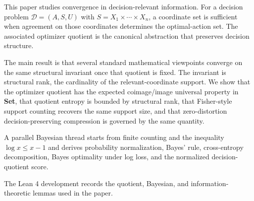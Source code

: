 This paper studies convergence in decision-relevant information. For a decision problem $\mathcal{D}=(A,S,U)$ with $S=X_1 \times \cdots \times X_n$, a coordinate set is sufficient when agreement on those coordinates determines the optimal-action set. The associated optimizer quotient is the canonical abstraction that preserves decision structure.

The main result is that several standard mathematical viewpoints converge on the same structural invariant once that quotient is fixed. The invariant is structural rank, the cardinality of the relevant-coordinate support. We show that the optimizer quotient has the expected coimage/image universal property in \textbf{Set}, that quotient entropy is bounded by structural rank, that Fisher-style support counting recovers the same support size, and that zero-distortion decision-preserving compression is governed by the same quantity.

A parallel Bayesian thread starts from finite counting and the inequality $\log x \le x - 1$ and derives probability normalization, Bayes' rule, cross-entropy decomposition, Bayes optimality under log loss, and the normalized decision-quotient score.

The Lean 4 development records the quotient, Bayesian, and information-theoretic lemmas used in the paper.
